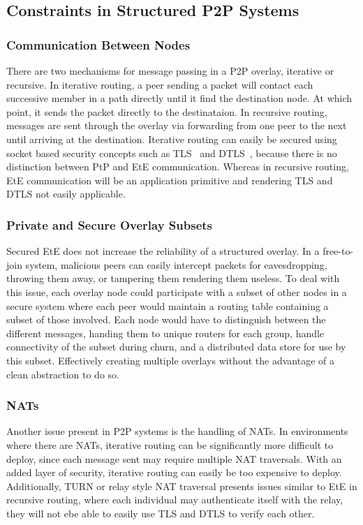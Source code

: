 \documentclass[conference]{IEEEtran}
\begin{document}
\subsection{Constraints in Structured P2P Systems}
\subsubsection{Communication Between Nodes}
There are two mechanisms for message passing in a P2P overlay, iterative or
recursive.  In iterative routing, a peer sending a packet will contact each
successive member in a path directly until it find the destination node.  At
which point, it sends the packet directly to the destinataion.  In recursive
routing, messages are sent through the overlay via forwarding from one peer to
the next until arriving at the destination.  Iterative routing can easily be
secured using socket based security concepts such as TLS~\cite{tls} and
DTLS~\cite{dtls}, because there is no distinction between PtP
and EtE communication.  Whereas in recursive routing, EtE
communication will be an application primitive and rendering TLS and DTLS not
easily applicable.

\subsubsection{Private and Secure Overlay Subsets}
Secured EtE does not increase the reliability of a structured
overlay.  In a free-to-join system, malicious peers can easily intercept packets
for eavesdropping, throwing them away, or tampering them rendering them useless.  To deal with
this issue, each overlay node could participate with a subset of other nodes in
a secure system where each peer would maintain a routing table containing a subset
of those involved.  Each node would have to distinguish between the different
messages, handing them to unique routers for each group, handle connectivity
of the subset during churn, and a distributed data store for use by this subset.
Effectively creating multiple overlays without the advantage of a clean
abstraction to do so.

\subsubsection{NATs}
Another issue present in P2P systems is the handling of NATs.  In environments
where there are NATs, iterative routing can be significantly more difficult to
deploy, since each message sent may require multiple NAT traversals.  With an
added layer of security, iterative routing can easily be too expensive to
deploy.   Additionally, TURN or relay style NAT traversal presents issues
similar to EtE in recursive routing, where each individual may authenticate
itself with the relay, they will not ebe able to easily use TLS and DTLS to
verify each other.
\end{document}
